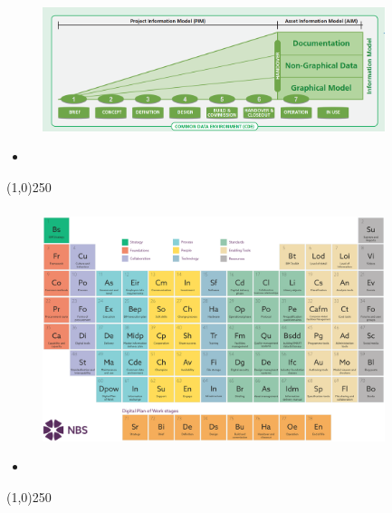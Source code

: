 \begin{frame}
\frametitle{}
\begin{figure}
	\centering
	\includegraphics[width=10cm]{./images/Levels-of-Definition-with-BIM-1.png}
	\caption[]{}
	\label{fig:}
\end{figure}
\begin{itemize}
	\item 
\end{itemize}
\end{frame}
\begin{center}\line(1,0){250}\end{center}






\begin{frame}
\frametitle{}
\begin{figure}
	\centering
	\includegraphics[width=10cm]{./images/nbs-periodic-table-of-bim1.png}
	\caption[]{}
	\label{fig:}
\end{figure}
\begin{itemize}
	\item 
\end{itemize}
\end{frame}
\begin{center}\line(1,0){250}\end{center}



